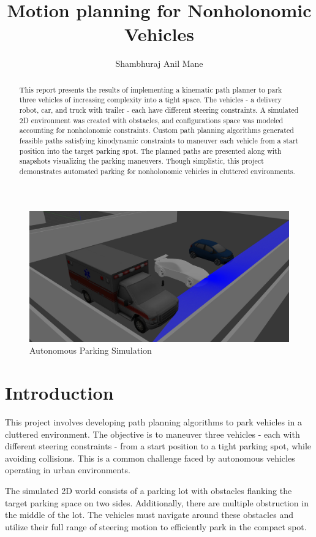 \documentclass[12pt,a4paper]{article}
\title{Motion planning for Nonholonomic Vehicles}
\author{Shambhuraj Anil Mane}
\begin{document}
\maketitle

\begin{abstract}
    This report presents the results of implementing a kinematic path planner to park three vehicles of increasing complexity into a tight space. The vehicles - a delivery robot, car, and truck with trailer - each have different steering constraints. A simulated 2D environment was created with obstacles, and configurations space was modeled accounting for nonholonomic constraints. Custom path planning algorithms generated feasible paths satisfying kinodynamic constraints to maneuver each vehicle from a start position into the target parking spot. The planned paths are presented along with snapshots visualizing the parking maneuvers. Though simplistic, this project demonstrates automated parking for nonholonomic vehicles in cluttered environments.
\end{abstract}

\begin{figure}[htbp!]
\begin{center}
\includegraphics[width=1.0 \columnwidth]{images/park.jpeg}
\end{center}
\caption{Autonomous Parking Simulation }
\label{fig:Occupancy_grid}
\end{figure}
\pagebreak
\section{Introduction}\label{sec:intro}
This project involves developing path planning algorithms to park vehicles in a cluttered environment. The objective is to maneuver three vehicles - each with different steering constraints - from a start position to a tight parking spot, while avoiding collisions. This is a common challenge faced by autonomous vehicles operating in urban environments.\par
The simulated 2D world consists of a parking lot with obstacles flanking the target parking space on two sides. Additionally, there are multiple obstruction in the middle of the lot. The vehicles must navigate around these obstacles and utilize their full range of steering motion to efficiently park in the compact spot.\par
\end{document}
